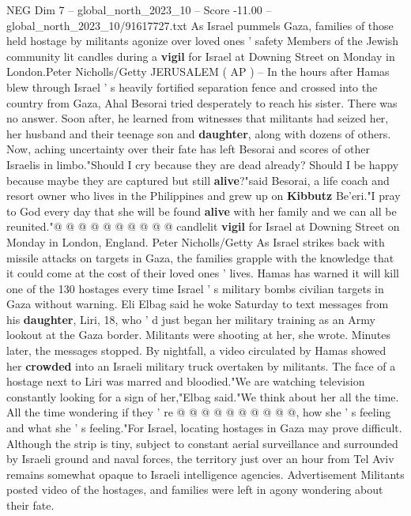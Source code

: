 \begin{textsample}{NEG Dim 7 – global\_north\_2023\_10 – Score -11.00 – global\_north\_2023\_10/91617727.txt}  \label{ex:f7_neg_027}
As Israel pummels Gaza, families of those held hostage by militants agonize over loved ones ' safety Members of the Jewish community lit candles during a \textbf{vigil} for Israel at Downing Street on Monday in London.Peter Nicholls/Getty JERUSALEM ( AP ) -- In the hours after Hamas blew through Israel ' s heavily fortified separation fence and crossed into the country from Gaza, Ahal Besorai tried desperately to reach his sister.
There was no answer.
Soon after, he learned from witnesses that militants had seized her, her husband and their teenage son and \textbf{daughter}, along with dozens of others.
Now, aching uncertainty over their fate has left Besorai and scores of other Israelis in limbo."Should I cry because they are dead already?
Should I be happy because maybe they are captured but still \textbf{alive}?"said Besorai, a life coach and resort owner who lives in the Philippines and grew up on \textbf{Kibbutz} Be'eri."I pray to God every day that she will be found \textbf{alive} with her family and we can all be reunited."@ @ @ @ @ @ @ @ @ @ candlelit \textbf{vigil} for Israel at Downing Street on Monday in London, England.
Peter Nicholls/Getty As Israel strikes back with missile attacks on targets in Gaza, the families grapple with the knowledge that it could come at the cost of their loved ones ' lives.
Hamas has warned it will kill one of the 130 hostages every time Israel ' s military bombs civilian targets in Gaza without warning.
Eli Elbag said he woke Saturday to text messages from his \textbf{daughter}, Liri, 18, who ' d just began her military training as an Army lookout at the Gaza border.
Militants were shooting at her, she wrote.
Minutes later, the messages stopped.
By nightfall, a video circulated by Hamas showed her \textbf{crowded} into an Israeli military truck overtaken by militants.
The face of a hostage next to Liri was marred and bloodied."We are watching television constantly looking for a sign of her,"Elbag said."We think about her all the time.
All the time wondering if they ' re @ @ @ @ @ @ @ @ @ @, how she ' s feeling and what she ' s feeling."For Israel, locating hostages in Gaza may prove difficult.
Although the strip is tiny, subject to constant aerial surveillance and surrounded by Israeli ground and naval forces, the territory just over an hour from Tel Aviv remains somewhat opaque to Israeli intelligence agencies.
Advertisement Militants posted video of the hostages, and families were left in agony wondering about their fate.

\end{textsample}
